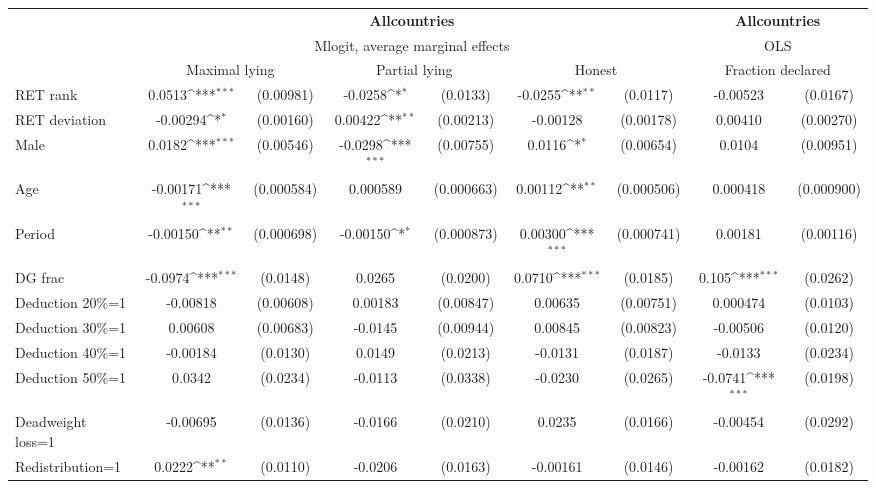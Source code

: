 \def\sym#1{\ifmmode^{#1}\else\(^{#1}\)\fi}
\begin{tabular}{l|cccccc|cc}
\hline\hline
&\multicolumn{6}{c|}{\bf All\space{}countries}&\multicolumn{2}{c}{\bf All\space{}countries}\\ &\multicolumn{6}{c|}{Mlogit, average marginal effects }&\multicolumn{2}{c}{OLS}\\
                &\multicolumn{2}{c}{Maximal lying}&\multicolumn{2}{c}{Partial lying}&\multicolumn{2}{c}{Honest}  &\multicolumn{2}{c}{Fraction declared}\\
\hline
RET rank        &   0.0513\sym{***}&(0.00981)&  -0.0258\sym{*}  & (0.0133)&  -0.0255\sym{**} & (0.0117)& -0.00523         & (0.0167)\\
RET deviation   & -0.00294\sym{*}  &(0.00160)&  0.00422\sym{**} &(0.00213)& -0.00128         &(0.00178)&  0.00410         &(0.00270)\\
Male            &   0.0182\sym{***}&(0.00546)&  -0.0298\sym{***}&(0.00755)&   0.0116\sym{*}  &(0.00654)&   0.0104         &(0.00951)\\
Age             & -0.00171\sym{***}&(0.000584)& 0.000589         &(0.000663)&  0.00112\sym{**} &(0.000506)& 0.000418         &(0.000900)\\
Period          & -0.00150\sym{**} &(0.000698)& -0.00150\sym{*}  &(0.000873)&  0.00300\sym{***}&(0.000741)&  0.00181         &(0.00116)\\
DG frac         &  -0.0974\sym{***}& (0.0148)&   0.0265         & (0.0200)&   0.0710\sym{***}& (0.0185)&    0.105\sym{***}& (0.0262)\\
Deduction 20\%=1& -0.00818         &(0.00608)&  0.00183         &(0.00847)&  0.00635         &(0.00751)& 0.000474         & (0.0103)\\
Deduction 30\%=1&  0.00608         &(0.00683)&  -0.0145         &(0.00944)&  0.00845         &(0.00823)& -0.00506         & (0.0120)\\
Deduction 40\%=1& -0.00184         & (0.0130)&   0.0149         & (0.0213)&  -0.0131         & (0.0187)&  -0.0133         & (0.0234)\\
Deduction 50\%=1&   0.0342         & (0.0234)&  -0.0113         & (0.0338)&  -0.0230         & (0.0265)&  -0.0741\sym{***}& (0.0198)\\
Deadweight loss=1& -0.00695         & (0.0136)&  -0.0166         & (0.0210)&   0.0235         & (0.0166)& -0.00454         & (0.0292)\\
Redistribution=1&   0.0222\sym{**} & (0.0110)&  -0.0206         & (0.0163)& -0.00161         & (0.0146)& -0.00162         & (0.0182)\\

\end{tabular}
